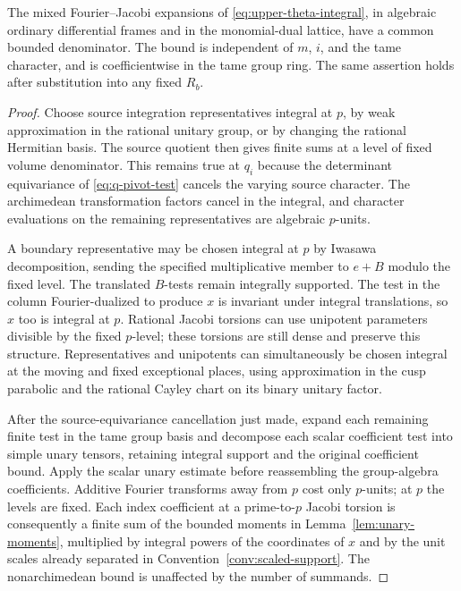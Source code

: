 \begin{lemma}\label{lem:mixed-expansions}
 The mixed Fourier--Jacobi expansions of
 \eqref{eq:upper-theta-integral}, in algebraic ordinary differential
 frames and in the monomial-dual lattice, have a common bounded
 denominator.  The bound is independent of $m$, $i$, and the tame
 character, and is coefficientwise in the tame group ring.  The same
 assertion holds after substitution into any fixed $R_b$.
\end{lemma}
\begin{proof}
 Choose source integration representatives integral at $p$, by weak
 approximation in the rational unitary group, or by changing the
 rational Hermitian basis.  The source quotient then gives finite sums
 at a level of fixed volume denominator.  This remains true at $q_i$
 because the determinant equivariance of
 \eqref{eq:q-pivot-test} cancels the varying source character.
 The archimedean transformation factors cancel in the integral, and
 character evaluations on the remaining representatives are algebraic
 $p$-units.

 A boundary representative may be chosen integral at $p$ by Iwasawa
 decomposition, sending the specified multiplicative member to
 $e+B$ modulo the fixed level.  The translated $B$-tests remain
 integrally supported.  The test in the column Fourier-dualized to
 produce $x$ is invariant under integral translations, so $x$ too is
 integral at $p$.  Rational Jacobi torsions can use unipotent
 parameters divisible by the fixed $p$-level; these torsions are still
 dense and preserve this structure.  Representatives and unipotents
 can simultaneously be chosen integral at the moving and fixed
 exceptional places, using approximation in the cusp parabolic and
 the rational Cayley chart on its binary unitary factor.

 After the source-equivariance cancellation just made, expand each
 remaining finite test in the tame group basis and decompose each
 scalar coefficient test into simple unary tensors, retaining integral
 support and the original coefficient bound.  Apply the scalar unary
 estimate before reassembling the group-algebra coefficients.  Additive
 Fourier transforms away from $p$ cost only $p$-units; at $p$ the
 levels are fixed.  Each index coefficient at a prime-to-$p$ Jacobi
 torsion is consequently a finite sum of the bounded moments in
 Lemma~\ref{lem:unary-moments}, multiplied by integral powers of the
 coordinates of $x$ and by the unit scales already separated in
 Convention~\ref{conv:scaled-support}.  The nonarchimedean bound is
 unaffected by the number of summands.


\end{proof}

